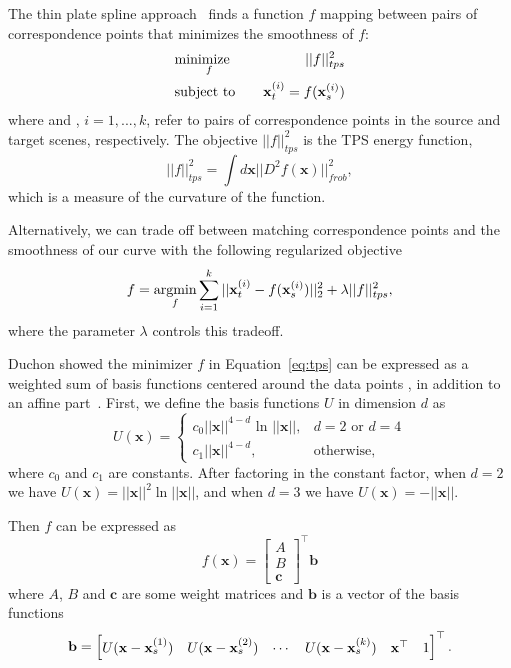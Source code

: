 The thin plate spline approach~\cite{Wahba1990} finds a function $f$ mapping between pairs of correspondence points that minimizes the smoothness of $f$:
\begin{equation}
\begin{align}
 &\underset{f}{\text{minimize\ \ \ }} & ||f||_{tps}^2 \\
 &\text{subject to\ \ \ }
 & \mathbf{x}_t^{(i)} = f(\mathbf{x}_s^{(i)}) \\
\end{align}
\label{eq:tps}
\end{equation}
where  and , $i = 1,...,k$, refer to pairs of correspondence points in the source and target scenes, respectively. The objective $||f||_{tps}^2$ is the TPS energy function,
\begin{equation}
||f||_{tps}^2 = \int d\mathbf{x} || D^2 f(\mathbf{x})||_{frob}^2,
\label{eq:tps_energy}
\end{equation}
which is a measure of the curvature of the function.

Alternatively, we can trade off between matching correspondence points and the smoothness of our curve with the following regularized objective
\begin{equation}
f = \underset{f}{\text{argmin}} \sum_{i=1}^k ||\mathbf{x}_t^{(i)} - f(\mathbf{x}_s^{(i)})||_2^2 + \lambda ||f||_{tps}^2,
\label{eq:tps_reg}
\end{equation}
where the parameter $\lambda$ controls this tradeoff.

Duchon showed the minimizer $f$ in Equation~\ref{eq:tps} can be expressed as a weighted sum of basis functions centered around the data points , in addition to an affine part~\cite{Duchon1977}. First, we define the basis functions $U$ in dimension $d$ as
\begin{equation}
U(\mathbf{x}) = \begin{cases}
    c_0 ||\mathbf{x}||^{4-d} \text{ ln } ||\mathbf{x}||, & d = 2 \text{ or } d = 4\\
    c_1 ||\mathbf{x}||^{4-d}, & \text{otherwise},
  \end{cases}
\end{equation}
where $c_0$ and $c_1$ are constants.
After factoring in the constant factor, when $d = 2$ we have $U(\mathbf{x}) = ||\mathbf{x}||^2 \ln||\mathbf{x}||$, and when $d = 3$ we have $U(\mathbf{x}) = -||\mathbf{x}||$.

Then $f$ can be expressed as
\begin{equation}
f(\mathbf{x}) = 
\begin{bmatrix}
A \\
B \\
\mathbf{c}
\end{bmatrix}^\top
\mathbf{b}
\end{equation}
where $A$, $B$ and $\mathbf{c}$ are some weight matrices and $\mathbf{b}$ is a vector of the basis functions
\begin{equation}
\mathbf{b} =
\begin{bmatrix} 
  U(\mathbf{x} - \mathbf{x}_s^{(1)}) & U(\mathbf{x} - \mathbf{x}_s^{(2)}) & \cdots & U(\mathbf{x} - \mathbf{x}_s^{(k)}) & \mathbf{x}^\top & 1
\end{bmatrix}^\top .
\end{equation}

